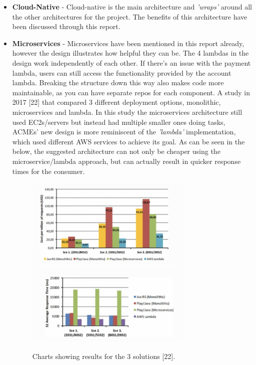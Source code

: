   \begin{itemize}
    \item \textbf{Cloud-Native} - Cloud-native is the main architecture and \textit{'wraps'} around all the other architectures for the project. The benefits
    of this architecture have been discussed through this report.

    \item \textbf{Microservices} - Microservices have been mentioned in this report already, however the design illustrates how helpful they can be. The 4 
    lambdas in the design work independently of each other. If there's an issue with the payment lambda, users can still access the functionality provided by 
    the account lambda. Breaking the structure down this way also makes code more maintainable, as you can have separate repos for each component. A study 
    in 2017 [22] that compared 3 different deployment options, monolithic, microservices and lambda. In this study the microservices architecture still used
    EC2s/servers but instead had multiple smaller ones doing tasks, ACMEs' new design is more reminiscent of the \textit{'lambda'} implementation, which used
    different AWS services to achieve its goal. As can be seen in the below, the suggested architecture can not only be cheaper using the microservice/lambda 
    approach, but can actually result in quicker response times for the consumer.
    
    \begin{figure}[H]
      \centering
      \includegraphics[width=8cm]{assets/costComparison.png}
      \includegraphics[width=8cm]{assets/responseTimeComparison.png}
      \caption{Charts showing results for the 3 solutions [22].}
      \label{fig:costComparison}
    \end{figure}


\end{itemize}
